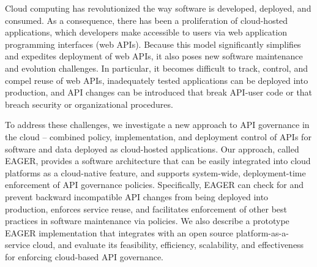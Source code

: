 Cloud computing has revolutionized the way software is
developed, deployed, and consumed.  As a consequence, there has been a
proliferation of cloud-hosted applications, which developers make accessible to users via
web application programming interfaces (web APIs).
Because this model significantly simplifies and expedites
deployment of web APIs, it also poses new software maintenance and evolution
challenges.  In particular, it becomes difficult to track, control, and compel
reuse of web APIs, inadequately tested applications can be
deployed into production, and API changes can be introduced that
break API-user code or that breach security or organizational procedures.

To address these challenges, we investigate a new approach to API governance
in the cloud -- combined policy, implementation, and deployment control of APIs for
software and data deployed as cloud-hosted applications.  Our approach, called EAGER,
provides a software architecture that can be easily integrated into cloud
platforms as a cloud-native feature, and supports system-wide, 
deployment-time enforcement of API governance policies.
Specifically, EAGER can check for and
prevent backward incompatible API changes from
being deployed into production,
enforces service reuse, and facilitates enforcement of other best practices
in software maintenance via policies.  We also describe a prototype
EAGER implementation that
integrates with an open source platform-as-a-service cloud, and
evaluate its feasibility, efficiency,
scalability, and effectiveness for enforcing cloud-based API governance.

